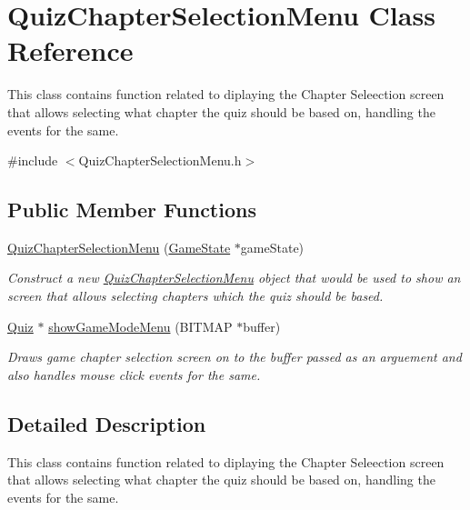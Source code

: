 \hypertarget{class_quiz_chapter_selection_menu}{}\section{Quiz\+Chapter\+Selection\+Menu Class Reference}
\label{class_quiz_chapter_selection_menu}


This class contains function related to diplaying the Chapter Seleection screen that allows selecting what chapter the quiz should be based on, handling the events for the same.  




{\ttfamily \#include $<$Quiz\+Chapter\+Selection\+Menu.\+h$>$}

\subsection*{Public Member Functions}
\begin{DoxyCompactItemize}
\item 
\mbox{\hyperlink{class_quiz_chapter_selection_menu_a825635a0dd17939087e46f91b83f6785}{Quiz\+Chapter\+Selection\+Menu}} (\mbox{\hyperlink{struct_game_state}{Game\+State}} $\ast$game\+State)
\begin{DoxyCompactList}\small\item\em Construct a new \mbox{\hyperlink{class_quiz_chapter_selection_menu}{Quiz\+Chapter\+Selection\+Menu}} object that would be used to show an screen that allows selecting chapters which the quiz should be based. \end{DoxyCompactList}\item 
\mbox{\hyperlink{class_quiz}{Quiz}} $\ast$ \mbox{\hyperlink{class_quiz_chapter_selection_menu_ad1b6d7cabeb57060ce96bd53d2d9dc50}{show\+Game\+Mode\+Menu}} (B\+I\+T\+M\+AP $\ast$buffer)
\begin{DoxyCompactList}\small\item\em Draws game chapter selection screen on to the buffer passed as an arguement and also handles mouse click events for the same. \end{DoxyCompactList}\end{DoxyCompactItemize}


\subsection{Detailed Description}
This class contains function related to diplaying the Chapter Seleection screen that allows selecting what chapter the quiz should be based on, handling the events for the same. 



